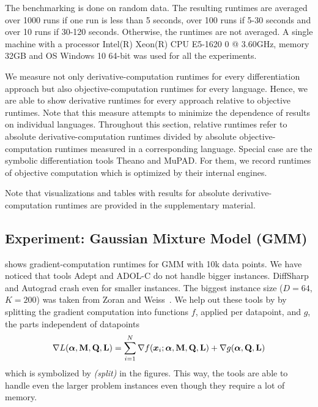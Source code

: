 \documentclass[suppldata]{article}
\begin{document}
The benchmarking is done on random data. The resulting runtimes are averaged over 1000 runs if one run is less than 5 seconds, over 100 runs if 5-30 seconds and over 10 runs if 30-120 seconds. Otherwise, the runtimes are not averaged.  A single machine with a processor Intel(R) Xeon(R) CPU E5-1620 0 @ 3.60GHz, memory 32GB and OS Windows 10 64-bit was used for all the experiments.

We measure not only derivative-computation runtimes for every differentiation approach but also objective-computation runtimes for every language. Hence, we are able to show derivative runtimes for every approach relative to objective runtimes. Note that this measure attempts to minimize the dependence of results on individual languages. Throughout this section, relative runtimes refer to absolute derivative-computation runtimes divided by absolute objective-computation runtimes measured in a corresponding language. Special case are the symbolic differentiation tools Theano and MuPAD. For them, we record runtimes of objective computation which is optimized by their internal engines.

Note that visualizations and tables with results for absolute derivative-computation runtimes are provided in the supplementary material.

\subsection*{Experiment: Gaussian Mixture Model (GMM)}

 shows gradient-computation runtimes for GMM with 10k data points.  We have noticed that tools Adept and ADOL-C do not handle bigger instances. 
DiffSharp and Autograd crash even for smaller instances. 
The biggest instance size ($D = 64$, $K = 200$) was taken from Zoran and Weiss~\cite{Zoran11gmm}. 
We help out these tools by  by splitting the gradient computation into functions $f$, applied per datapoint, and $g$, the parts independent of datapoints
\begin{equation}
\nabla L(\bm{\alpha},{\bf M},{\bf Q},{\bf L}) = \sum_{i=1}^N{\nabla f(\bm{x}_i;\bm{\alpha},{\bf M},{\bf Q},{\bf L}) + \nabla g(\bm{\alpha},{\bf Q},{\bf L})}
\end{equation}
which is symbolized by \emph{(split)} in the figures. This way, the tools are able to handle even the larger problem instances even though they require a lot of memory. 
\end{document}
